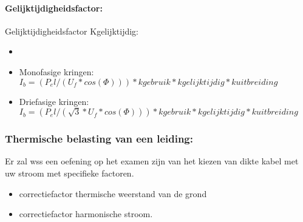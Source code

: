 \documentclass[12pt]{article}
\begin{document}
\paragraph{Gelijktijdigheidsfactor:}
Gelijktijdigheidsfactor Kgelijktijdig:\begin{itemize}
    \item 
\end{itemize}
\begin{itemize}
    \item Monofasige kringen:$I_b=(P_el/(U_f *cos(\Phi)))*kgebruik*kgelijktijdig*kuitbreiding$
    \item Driefasige kringen:$I_b=(P_el/(\sqrt{3}*U_f *cos(\Phi)))*kgebruik*kgelijktijdig*kuitbreiding$
\end{itemize}
\subsubsection{Thermische belasting van een leiding:}
Er zal wss een oefening op het examen zijn van het kiezen van dikte kabel met uw stroom met specifieke factoren.
\begin{itemize}
    \item correctiefactor thermische weerstand van de grond 
    \item correctiefactor harmonische stroom.
\end{itemize}
\end{document}
